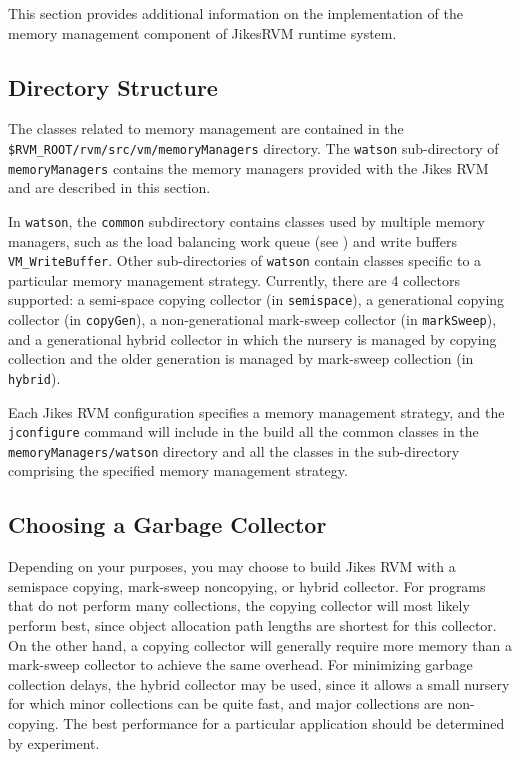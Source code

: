 This section provides additional information on the implementation
of the memory management component of Jikes\trademark RVM runtime system.
 
\subsection{Directory Structure} \label{sssec:directories}
The classes related to memory management are contained in the 
{\tt \$RVM\_ROOT/rvm/src/vm/memoryManagers}  directory.
The  {\tt watson}  sub-directory of  {\tt memoryManagers}  contains
the memory managers provided with the Jikes RVM
and are described in this section.  

In {\tt watson}, the {\tt common} subdirectory contains classes used by multiple
memory managers, such as the load balancing work queue
(see )
and write buffers {\tt VM\_WriteBuffer}.
Other sub-directories of {\tt watson} 
contain classes specific to a particular memory management strategy.
Currently, there are 4 collectors supported: 
a semi-space copying collector (in {\tt semispace}),
a generational copying collector (in {\tt copyGen}), 
a non-generational mark-sweep collector (in {\tt markSweep}), 
and a generational hybrid collector in which the nursery is managed by copying collection
and the older generation is managed by mark-sweep collection (in {\tt hybrid}).

Each Jikes RVM configuration specifies a memory management strategy, 
and the  {\tt jconfigure}   command will include in the build all the
common classes in the {\tt memoryManagers/watson} directory and 
all the classes in the sub-directory comprising the specified memory management strategy.

\subsection{Choosing a Garbage Collector} \label{ssec:choosinggc}
Depending on your purposes, you may choose to build Jikes RVM with a
semispace copying, mark-sweep noncopying, or hybrid collector.  For
programs that do not perform many collections, the copying collector
will most likely perform best, since object allocation path lengths
are shortest for this collector.  On the other hand, a copying
collector will generally require more memory than a mark-sweep
collector to achieve the same overhead. For minimizing garbage
collection delays, the hybrid collector may be used, since it allows a
small nursery for which minor collections can be quite fast, and major
collections are non-copying.  The best performance for a particular
application should be determined by experiment.

